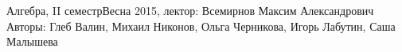


\BigHeader
	{Алгебра, II семестр}{Весна 2015, лектор: Всемирнов Максим Александрович}
	{Авторы: Глеб Валин, Михаил Никонов, Ольга Черникова, Игорь Лабутин, Саша Малышева}
	
% 
%
%
%





